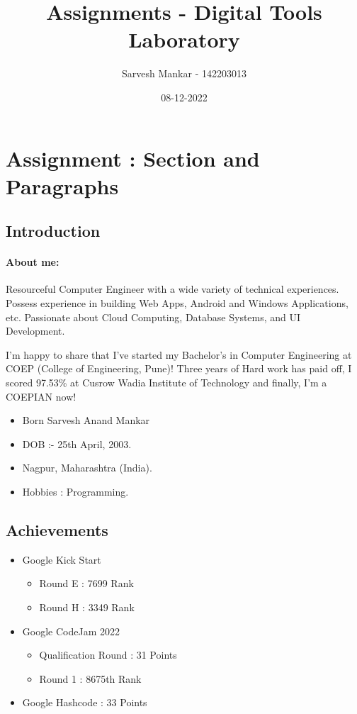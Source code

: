 \documentclass{article}
\title{Assignments - Digital Tools Laboratory}
\date{08-12-2022}
\author{Sarvesh Mankar - 142203013}
\begin{document}
	\newpage
	\tableofcontents
	
	
	\maketitle
	\newpage
	
	\section{Assignment : Section and Paragraphs}
	
	\subsection{Introduction}
	\paragraph{About me:} 
Resourceful Computer Engineer with a wide variety of technical experiences. Possess experience in building Web Apps, Android and Windows Applications, etc. Passionate about Cloud Computing, Database Systems, and UI Development.

I'm happy to share that I've started my Bachelor's in Computer Engineering at COEP (College of Engineering, Pune)! Three years of Hard work has paid off, I scored 97.53\% at Cusrow Wadia Institute of Technology and finally, I'm a COEPIAN now! 


\begin{itemize}
	\item Born	Sarvesh Anand Mankar
	\item DOB :- 25th April, 2003.
	\item Nagpur, Maharashtra (India).
	\item Hobbies : Programming.
\end{itemize}	
	
	
	\subsection{Achievements}
	\begin{itemize}
		\item[] Google Kick Start
		\begin{itemize}
			\item Round E : 7699 Rank
			\item Round H : 3349 Rank
		\end{itemize}
		\item[] Google CodeJam 2022
		\begin{itemize}
			\item Qualification Round : 31 Points
			\item Round 1 : 8675th Rank
		\end{itemize}
		\item[] Google Hashcode : 33 Points
	\end{itemize}
	
\end{document}
